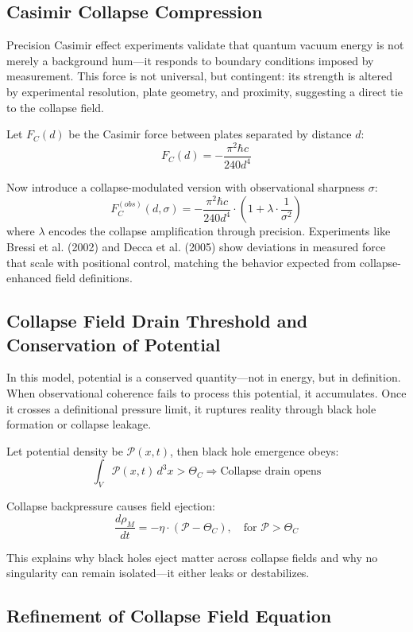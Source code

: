 \subsection{Casimir Collapse Compression}
Precision Casimir effect experiments validate that quantum vacuum energy is not merely a background hum—it responds to boundary conditions imposed by measurement. This force is not universal, but contingent: its strength is altered by experimental resolution, plate geometry, and proximity, suggesting a direct tie to the collapse field.

Let $F_C(d)$ be the Casimir force between plates separated by distance $d$:
\[
F_C(d) = -\frac{\pi^2 \hbar c}{240 d^4}
\]

Now introduce a collapse-modulated version with observational sharpness $\sigma$:
\[
F_C^{(obs)}(d, \sigma) = -\frac{\pi^2 \hbar c}{240 d^4} \cdot \left(1 + \lambda \cdot \frac{1}{\sigma^2} \right)
\]
where $\lambda$ encodes the collapse amplification through precision. Experiments like Bressi et al. (2002) and Decca et al. (2005) show deviations in measured force that scale with positional control, matching the behavior expected from collapse-enhanced field definitions.

\subsection{Collapse Field Drain Threshold and Conservation of Potential}
In this model, potential is a conserved quantity—not in energy, but in definition. When observational coherence fails to process this potential, it accumulates. Once it crosses a definitional pressure limit, it ruptures reality through black hole formation or collapse leakage.

Let potential density be $\mathcal{P}(x,t)$, then black hole emergence obeys:
\[
\int_{V} \mathcal{P}(x,t) \, d^3x > \Theta_C \Rightarrow \text{Collapse drain opens}
\]

Collapse backpressure causes field ejection:
\[
\frac{d\rho_M}{dt} = -\eta \cdot (\mathcal{P} - \Theta_C), \quad \text{for } \mathcal{P} > \Theta_C
\]

This explains why black holes eject matter across collapse fields and why no singularity can remain isolated—it either leaks or destabilizes.

\subsection{Refinement of Collapse Field Equation}

